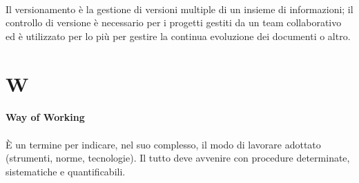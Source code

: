 \documentclass[10pt, a4paper]{article}
\begin{document}
\paragraph{}Il versionamento è la gestione di versioni multiple di un insieme di informazioni; il controllo di versione è necessario
per i progetti gestiti da un team collaborativo ed è utilizzato per lo più per gestire la continua evoluzione dei documenti o altro.



\newpage
\section{W}

\vspace{2em}
\paragraph{Way of Working}\noindent\hrulefill
\paragraph{}È un termine per indicare, nel suo complesso, il modo di lavorare adottato (strumenti, norme, tecnologie). Il tutto deve avvenire con procedure determinate, sistematiche e quantificabili.   

\end{document}
